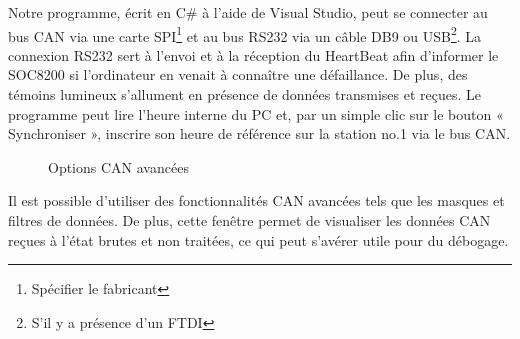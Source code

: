 \documentclass[10pt,a4paper,final]{article}
\begin{document}
\begin{spacing}{1.5}
Notre programme, écrit en C\# à l'aide de Visual Studio, peut se connecter au bus CAN via une carte SPI\footnote{Spécifier le fabricant} et au bus RS232 via un câble DB9 ou USB\footnote{S'il y a présence d'un FTDI}. La connexion RS232 sert à l'envoi et à la réception du HeartBeat afin d'informer le SOC8200 si l'ordinateur en venait à connaître une défaillance. De plus, des témoins lumineux s'allument en présence de données transmises et reçues. Le programme peut lire l'heure interne du PC et, par un simple clic sur le bouton « Synchroniser », inscrire son heure de référence sur la station no.1 via le bus CAN.\\
\vfill
\pagebreak


\begin{figure}[hbtp]
\caption{Options CAN avancées}
\centering
{}
\end{figure}
Il est possible d'utiliser des fonctionnalités CAN avancées tels que les masques et filtres de données. De plus, cette fenêtre permet de visualiser les données CAN reçues à l'état brutes et non traitées, ce qui peut s'avérer utile pour du débogage.
\pagebreak


\end{spacing}
\end{document}
